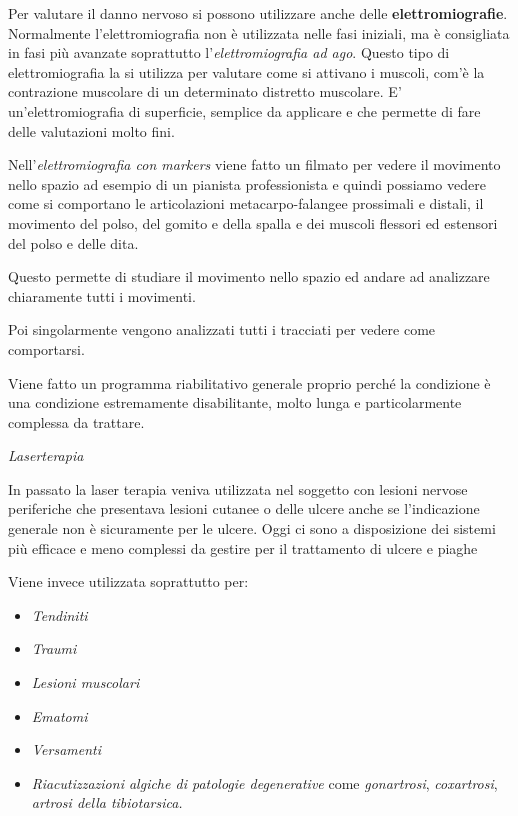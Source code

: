 \documentclass[]{article}
\begin{document}
Per valutare il danno nervoso si possono utilizzare anche delle
\textbf{elettromiografie}. Normalmente l'elettromiografia non è
utilizzata nelle fasi iniziali, ma è consigliata in fasi più avanzate
soprattutto l'\emph{elettromiografia ad ago}. Questo tipo di
elettromiografia la si utilizza per valutare come si attivano i muscoli,
com'è la contrazione muscolare di un determinato distretto muscolare. E'
un'elettromiografia di superficie, semplice da applicare e che permette
di fare delle valutazioni molto fini.

Nell'\emph{elettromiografia con markers} viene fatto un filmato per
vedere il movimento nello spazio ad esempio di un pianista
professionista e quindi possiamo vedere come si comportano le
articolazioni metacarpo-falangee prossimali e distali, il movimento del
polso, del gomito e della spalla e dei muscoli flessori ed estensori del
polso e delle dita.

Questo permette di studiare il movimento nello spazio ed andare ad
analizzare chiaramente tutti i movimenti.

Poi singolarmente vengono analizzati tutti i tracciati per vedere come
comportarsi.

Viene fatto un programma riabilitativo generale proprio perché la
condizione è una condizione estremamente disabilitante, molto lunga e
particolarmente complessa da trattare.

\emph{Laserterapia}

In passato la laser terapia veniva utilizzata nel soggetto con lesioni
nervose periferiche che presentava lesioni cutanee o delle ulcere anche
se l'indicazione generale non è sicuramente per le ulcere. Oggi ci sono
a disposizione dei sistemi più efficace e meno complessi da gestire per
il trattamento di ulcere e piaghe

Viene invece utilizzata soprattutto per:

\begin{itemize}
\item
  \emph{Tendiniti}
\item
  \emph{Traumi}
\item
  \emph{Lesioni muscolari}
\item
  \emph{Ematomi}
\item
  \emph{Versamenti}
\item
  \emph{Riacutizzazioni algiche di patologie degenerative} come
  \emph{gonartrosi}, \emph{coxartrosi}, \emph{artrosi della
  tibiotarsica.}
\end{itemize}
\end{document}
